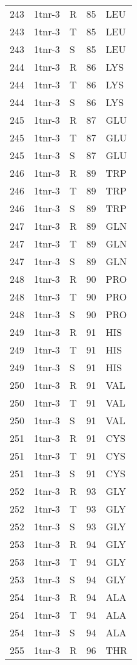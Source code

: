 \begin{tiny}
\begin{longtable}[l]{l|l|l|l|l}
	243 & 1tnr-3 & R & 85 & LEU \\
	243 & 1tnr-3 & T & 85 & LEU \\
	243 & 1tnr-3 & S & 85 & LEU \\
	244 & 1tnr-3 & R & 86 & LYS \\
	244 & 1tnr-3 & T & 86 & LYS \\
	244 & 1tnr-3 & S & 86 & LYS \\
	245 & 1tnr-3 & R & 87 & GLU \\
	245 & 1tnr-3 & T & 87 & GLU \\
	245 & 1tnr-3 & S & 87 & GLU \\
	246 & 1tnr-3 & R & 89 & TRP \\
	246 & 1tnr-3 & T & 89 & TRP \\
	246 & 1tnr-3 & S & 89 & TRP \\
	247 & 1tnr-3 & R & 89 & GLN \\
	247 & 1tnr-3 & T & 89 & GLN \\
	247 & 1tnr-3 & S & 89 & GLN \\
	248 & 1tnr-3 & R & 90 & PRO \\
	248 & 1tnr-3 & T & 90 & PRO \\
	248 & 1tnr-3 & S & 90 & PRO \\
	249 & 1tnr-3 & R & 91 & HIS \\
	249 & 1tnr-3 & T & 91 & HIS \\
	249 & 1tnr-3 & S & 91 & HIS \\
	250 & 1tnr-3 & R & 91 & VAL \\
	250 & 1tnr-3 & T & 91 & VAL \\
	250 & 1tnr-3 & S & 91 & VAL \\
	251 & 1tnr-3 & R & 91 & CYS \\
	251 & 1tnr-3 & T & 91 & CYS \\
	251 & 1tnr-3 & S & 91 & CYS \\
	252 & 1tnr-3 & R & 93 & GLY \\
	252 & 1tnr-3 & T & 93 & GLY \\
	252 & 1tnr-3 & S & 93 & GLY \\
	253 & 1tnr-3 & R & 94 & GLY \\
	253 & 1tnr-3 & T & 94 & GLY \\
	253 & 1tnr-3 & S & 94 & GLY \\
	254 & 1tnr-3 & R & 94 & ALA \\
	254 & 1tnr-3 & T & 94 & ALA \\
	254 & 1tnr-3 & S & 94 & ALA \\
	255 & 1tnr-3 & R & 96 & THR \\

\end{longtable}
\end{tiny}
